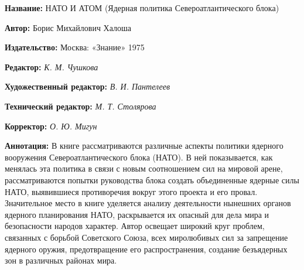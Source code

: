 \documentclass[12pt, a4paper, openany]{book}
\begin{document}
	{\bf Название:} НАТО И АТОМ (Ядерная политика Североатлантического блока) 
	
{\bf Автор:} Борис Михайлович Халоша
	
{\bf Издательство:} Москва: «Знание» 1975
	
		{\bf Редактор:} \textit{К. М. Чушкова}
	
		{\bf Художественный редактор:} \textit{В. И. Пантелеев}
	
		{\bf Технический редактор:} \textit{М. Т. Столярова}
	
		{\bf Корректор:} \textit{О. Ю. Мигун}
	
		{\bf Аннотация:} В книге рассматриваются различные аспекты политики ядерного вооружения Североатлантического блока (НАТО). В ней показывается, как менялась эта политика в связи с новым соотношением сил на мировой арене, рассматриваются попытки руководства блока создать объединенные ядерные силы НАТО, выявившиеся противоречия вокруг этого проекта и его провал. Значительное место в книге уделяется анализу деятельности нынешних органов ядерного планирования НАТО, раскрывается их опасный для дела мира и безопасности народов характер. Автор освещает широкий круг проблем, связанных с борьбой Советского Союза, всех миролюбивых сил за запрещение ядерного оружия, предотвращение его распространения, создание безъядерных зон в различных районах мира. 
		\thispagestyle{empty} %

	
\end{document}
